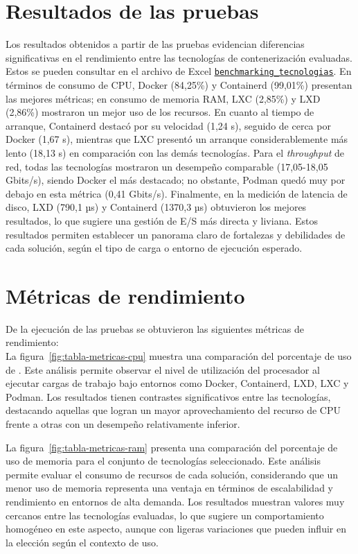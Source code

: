 \section{Resultados de las pruebas}\label{sec:resultados-pruebas}
\noindent
Los resultados obtenidos a partir de las pruebas evidencian diferencias significativas en el rendimiento entre las tecnologías de contenerización evaluadas. Estos se pueden consultar en el archivo de Excel \underline{\href{https://docs.google.com/spreadsheets/d/1Ce37Sm3Swyfa88Ur1yQbLarq_D86obUIAGGJocgQbUE/edit?usp=sharing} {\texttt{benchmarking\_tecnologias}}}.
En términos de consumo de CPU, Docker (84,25\%) y Containerd (99,01\%) presentan las mejores métricas; en consumo de memoria RAM, LXC (2,85\%) y LXD (2,86\%) mostraron un mejor uso de los recursos. En cuanto al tiempo de arranque, Containerd destacó por su velocidad (1,24 s), seguido de cerca por Docker (1,67 s), mientras que LXC presentó un arranque considerablemente más lento (18,13 s) en comparación con las demás tecnologías. Para el \textit{throughput} de red, todas las tecnologías mostraron un desempeño comparable (17,05-18,05 Gbits/s), siendo Docker el más destacado; no obstante, Podman quedó muy por debajo en esta métrica (0,41 Gbits/s). Finalmente, en la medición de latencia de disco, LXD (790,1 µs) y Containerd (1370,3 µs) obtuvieron los mejores resultados, lo que sugiere una gestión de E/S más directa y liviana. Estos resultados permiten establecer un panorama claro de fortalezas y debilidades de cada solución, según el tipo de carga o entorno de ejecución esperado.

\section{Métricas de rendimiento}
\noindent
De la ejecución de las pruebas se obtuvieron las siguientes métricas de rendimiento: \\

\noindent
La figura~\ref{fig:tabla-metricas-cpu} muestra una comparación del porcentaje de uso de \CPU. Este análisis permite observar el nivel de utilización del procesador al ejecutar cargas de trabajo bajo entornos como Docker, Containerd, LXD, LXC y Podman. Los resultados tienen contrastes significativos entre las tecnologías, destacando aquellas que logran un mayor aprovechamiento del recurso de CPU frente a otras con un desempeño relativamente inferior.


\noindent
La figura~\ref{fig:tabla-metricas-ram} presenta una comparación del porcentaje de uso de memoria \RAM para el conjunto de tecnologías seleccionado. Este análisis permite evaluar el consumo de recursos de cada solución, considerando que un menor uso de memoria representa una ventaja en términos de escalabilidad y rendimiento en entornos de alta demanda. Los resultados muestran valores muy cercanos entre las tecnologías evaluadas, lo que sugiere un comportamiento homogéneo en este aspecto, aunque con ligeras variaciones que pueden influir en la elección según el contexto de uso.


